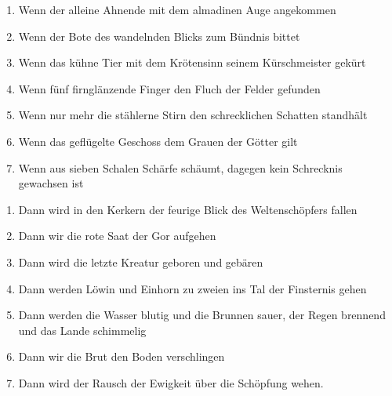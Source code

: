 \vspace{5mm}
\begin{enumerate}
\item Wenn der alleine Ahnende mit dem almadinen Auge angekommen
\item Wenn der Bote des wandelnden Blicks zum Bündnis bittet
\item Wenn das kühne Tier mit dem Krötensinn seinem Kürschmeister gekürt
\item Wenn fünf firnglänzende Finger den Fluch der Felder gefunden
\item Wenn nur mehr die stählerne Stirn den schrecklichen Schatten standhält
\item Wenn das geflügelte Geschoss dem Grauen der Götter gilt
\item Wenn aus sieben Schalen Schärfe schäumt, dagegen kein Schrecknis gewachsen ist 
\end{enumerate}
\vspace{5mm}
\begin{enumerate}
\item Dann wird in den Kerkern der feurige Blick des Weltenschöpfers fallen
\item Dann wir die rote Saat der Gor aufgehen
\item Dann wird die letzte Kreatur geboren und gebären
\item Dann werden Löwin und Einhorn zu zweien ins Tal der Finsternis gehen
\item Dann werden die Wasser blutig und die Brunnen sauer, der Regen brennend und das Lande schimmelig
\item Dann wir die Brut den Boden verschlingen
\item Dann wird der Rausch der Ewigkeit über die Schöpfung wehen.  
\end{enumerate}